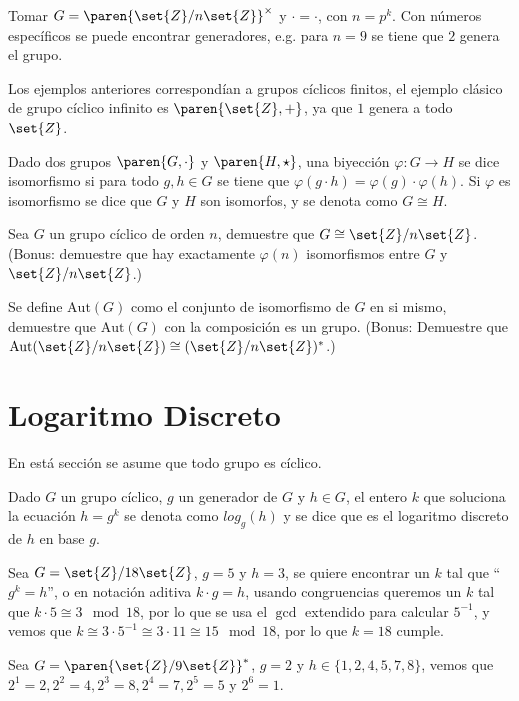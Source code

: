 \documentclass{ayudantia}
\begin{document}
\begin{ejm}
    Tomar \(G=\paren{\set{Z}/n\set{Z}}^\times\) y \(\cdot=\cdot\), con \(n=p^k\). Con números específicos se puede encontrar generadores, e.g. para \(n=9\) se tiene que \(2\) genera el grupo.
\end{ejm}

\begin{ejm}
    Los ejemplos anteriores correspondían a grupos cíclicos finitos, el ejemplo clásico de grupo cíclico infinito es \(\paren{\set{Z},+}\), ya que \(1\) genera a todo \(\set{Z}\).
\end{ejm}

\begin{defn}[Isomorfismo]
    Dado dos grupos \(\paren{G,\cdot}\) y \(\paren{H,\star}\), una biyección \(\varphi:G\rightarrow H\) se dice isomorfismo si para todo \(g,h\in G\) se tiene que \(\varphi(g\cdot h)=\varphi(g)\cdot \varphi(h)\). Si \(\varphi\) es isomorfismo se dice que \(G\) y \(H\) son isomorfos, y se denota como \(G\cong H\).
\end{defn}
\begin{prob}
    Sea \(G\) un grupo cíclico de orden \(n\), demuestre que \(G\cong \set{Z}/n\set{Z}\). (Bonus: demuestre que hay exactamente \(\varphi(n)\) isomorfismos entre \(G\) y \(\set{Z}/n\set{Z}\).)
\end{prob}
\begin{prob}[Bonus]
    Se define \(\text{Aut}(G)\) como el conjunto de isomorfismo de \(G\) en si mismo, demuestre que \(\text{Aut}(G)\) con la composición es un grupo. (Bonus: Demuestre que \(\text{Aut}(\set{Z}/n\set{Z})\cong (\set{Z}/n\set{Z})^*\).)
\end{prob}
\section{Logaritmo Discreto}
En está sección se asume que todo grupo es cíclico.
\begin{defn}
    Dado \(G\) un grupo cíclico, \(g\) un generador de \(G\) y \(h\in G\), el entero \(k\) que soluciona la ecuación \(h=g^k\) se denota como \(log_g(h)\) y se dice que es el logaritmo discreto de \(h\) en base \(g\).
\end{defn}

\begin{ejm}
    Sea \(G=\set{Z}/18\set{Z}\), \(g=5\) y \(h=3\), se quiere encontrar un \(k\) tal que ``\(g^k=h\)'', o en notación aditiva \(k\cdot g=h\), usando congruencias queremos un \(k\) tal que \(k\cdot 5\cong 3\mod 18\), por lo que se usa el \(\gcd\) extendido para calcular \(5^{-1}\), y vemos que \(k\cong 3\cdot 5^{-1}\cong 3\cdot 11\cong 15\mod 18\), por lo que \(k=18\) cumple.
\end{ejm}

\begin{ejm}
    Sea \(G=\paren{\set{Z}/9\set{Z}}^*\), \(g=2\) y \(h\in\{1,2,4,5,7,8\}\), vemos que \(2^1=2,2^2=4,2^3=8,2^4=7,2^5=5\) y \(2^6=1\).
\end{ejm}
\end{document}
